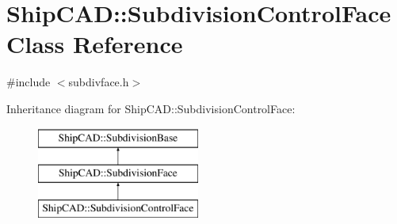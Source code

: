 \hypertarget{classShipCAD_1_1SubdivisionControlFace}{\section{Ship\-C\-A\-D\-:\-:Subdivision\-Control\-Face Class Reference}
\label{classShipCAD_1_1SubdivisionControlFace}
}


{\ttfamily \#include $<$subdivface.\-h$>$}

Inheritance diagram for Ship\-C\-A\-D\-:\-:Subdivision\-Control\-Face\-:\begin{figure}[H]
\begin{center}
\leavevmode
\includegraphics[height=3.000000cm]{classShipCAD_1_1SubdivisionControlFace}
\end{center}
\end{figure}
